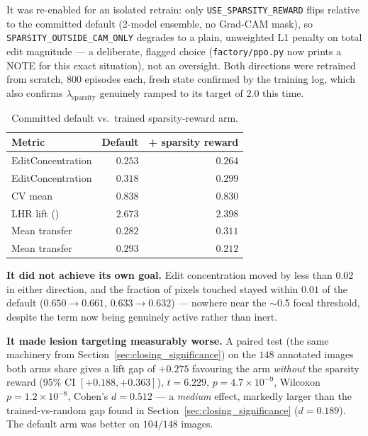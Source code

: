It was re-enabled for an isolated retrain: only \texttt{USE\_SPARSITY\_REWARD}
flips relative to the committed default (2-model ensemble, no Grad-CAM
mask), so \texttt{SPARSITY\_OUTSIDE\_CAM\_ONLY} degrades to a plain,
unweighted L1 penalty on total edit magnitude --- a deliberate, flagged
choice (\texttt{factory/ppo.py} now prints a NOTE for this exact
situation), not an oversight. Both directions were retrained from
scratch, 800 episodes each, fresh state confirmed by the training log,
which also confirms $\lambda_{\text{sparsity}}$ genuinely ramped to its
target of $2.0$ this time.

\begin{table}[h]
\centering
\caption{Committed default vs.\ trained sparsity-reward arm.}
\label{tab:sparsity_results}
\begin{tabular}{@{}lrr@{}}
\toprule
\textbf{Metric} & \textbf{Default} & \textbf{+ sparsity reward} \\
\midrule
EditConcentration \ntop{} & $0.253$ & $0.264$ \\
EditConcentration \pton{} & $0.318$ & $0.299$ \\
CV mean & $0.838$ & $0.830$ \\
LHR lift (\pton{}) & $2.673$ & $2.398$ \\
Mean transfer \ntop{} & $0.282$ & $0.311$ \\
Mean transfer \pton{} & $0.293$ & $0.212$ \\
\bottomrule
\end{tabular}
\end{table}

\textbf{It did not achieve its own goal.} Edit concentration moved by
less than $0.02$ in either direction, and the fraction of pixels touched
stayed within $0.01$ of the default ($0.650\to0.661$, $0.633\to0.632$)
--- nowhere near the $\sim$0.5 focal threshold, despite the term now
being genuinely active rather than inert.

\textbf{It made lesion targeting measurably worse.} A paired test
(the same machinery from Section~\ref{sec:closing_significance}) on the
$148$ annotated images both arms share gives a lift gap of $+0.275$
favouring the arm \emph{without} the sparsity reward (95\% CI
$[+0.188, +0.363]$), $t=6.229$, $p=4.7\times10^{-9}$, Wilcoxon
$p=1.2\times10^{-8}$, Cohen's $d=0.512$ --- a \emph{medium} effect,
markedly larger than the trained-vs-random gap found in
Section~\ref{sec:closing_significance} ($d=0.189$). The default arm was
better on $104/148$ images.

